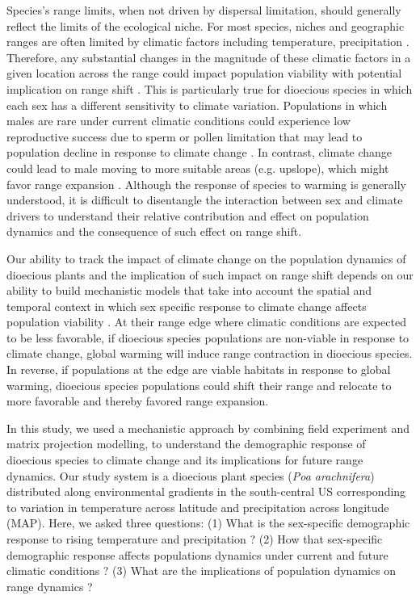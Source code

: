 \documentclass[11pt]{article}
\begin{document}
Species's range limits, when not driven by dispersal limitation, should generally reflect the limits of the ecological niche. 
For most species, niches and geographic ranges are often limited by climatic factors including temperature, precipitation \citep{sexton2009evolution}. 
Therefore, any substantial changes in the magnitude of these climatic factors in a given location across the range could impact population viability  with potential implication on range shift \citep{davis2001range, pease1989model}. 
This is particularly true for dioecious species in which each sex has a different sensitivity to climate variation\citep{pottier2021sexual,morrison2016causes}.
Populations in which males are rare under current climatic conditions could experience low reproductive success due to sperm or pollen limitation that may lead to population decline in response to climate change \citep{eberhart2017sex}.
In contrast, climate change could lead to male moving to more suitable areas (e.g. upslope), which might favor range expansion \citep{petry2016sex}.
Although the response of species to warming is generally understood, it is difficult to disentangle the interaction between sex and climate drivers to understand their relative contribution and effect on population dynamics and the consequence of such effect on range  shift. 

Our ability to track the impact of climate change on the population dynamics of dioecious plants and the implication of such impact on range shift depends on our ability to build mechanistic models that take into account the spatial and temporal context in which sex specific response to climate change affects population viability \citep{davis2001range,evans2016towards,czachura2020demographic}.
At their range edge where climatic conditions are expected to be less favorable, if dioecious species populations are non-viable in response to climate change, global warming will induce range contraction in dioecious species.
In reverse, if populations at the edge are viable habitats in response to global warming, dioecious species populations could shift their range and relocate to more favorable and thereby favored range expansion. 

In this study, we used a mechanistic approach by combining field experiment and matrix projection modelling, to understand the demographic response of dioecious species to climate change and its implications for future range dynamics.
Our study system is a dioecious plant species (\textit{Poa arachnifera}) distributed along environmental gradients in the south-central US corresponding to variation in temperature across latitude and precipitation across longitude (MAP). 
Here, we asked three questions: (1) What is the sex-specific demographic response to rising temperature and precipitation ?
(2) How that sex-specific demographic response affects populations dynamics under current and future climatic conditions ?
(3) What are the implications of population dynamics on range dynamics ?   
\end{document}
